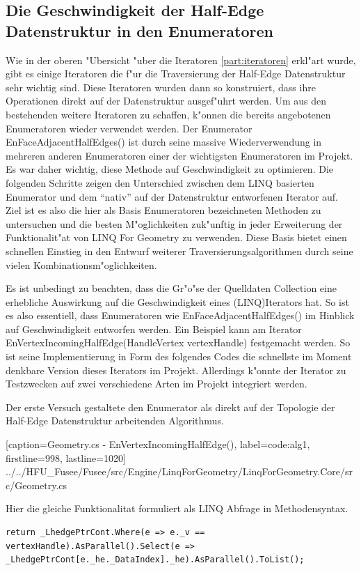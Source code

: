 \documentclass[pagesize, paper=a4, fontsize=12pt,titlepage=true, headings=small, headnosepline, abstractoff, liststotoc, nochapterprefix, plainheadsepline]{scrreprt}
\newcommand{\LFGS}{LINQ For Geometry }
\newcommand{\HES}{Half-Edge Datenstruktur }
\begin{document}
\subsection {Die Geschwindigkeit der Half-Edge Datenstruktur in den Enumeratoren}
Wie in der oberen "Ubersicht "uber die Iteratoren \ref{part:iteratoren} erkl"art wurde, gibt es einige Iteratoren die f"ur die Traversierung der \HES sehr wichtig sind. Diese Iteratoren wurden dann so konstruiert, dass ihre Operationen direkt auf der Datenstruktur ausgef"uhrt werden. Um aus den bestehenden weitere Iteratoren zu schaffen, k"onnen die bereits angebotenen Enumeratoren wieder verwendet werden. Der Enumerator EnFaceAdjacentHalfEdges() ist durch seine massive Wiederverwendung in mehreren anderen Enumeratoren einer der wichtigsten Enumeratoren im Projekt. Es war daher wichtig, diese Methode auf Geschwindigkeit zu optimieren. Die folgenden Schritte zeigen den Unterschied zwischen dem LINQ basierten Enumerator und dem "`nativ"' auf der Datenstruktur entworfenen Iterator auf. Ziel ist es also die hier als Basis Enumeratoren bezeichneten Methoden zu untersuchen und die besten M"oglichkeiten zuk"unftig in jeder Erweiterung der Funktionalit"at von \LFGS zu verwenden. Diese Basis bietet einen schnellen Einstieg in den Entwurf weiterer Traversierungsalgorithmen durch seine vielen Kombinationsm"oglichkeiten.

Es ist unbedingt zu beachten, dass die Gr"o"se der Quelldaten Collection eine erhebliche Auswirkung auf die Geschwindigkeit eines (LINQ)Iterators hat. So ist es also essentiell, dass Enumeratoren wie EnFaceAdjacentHalfEdges() im Hinblick auf Geschwindigkeit entworfen werden. Ein Beispiel kann am Iterator EnVertexIncomingHalfEdge(HandleVertex vertexHandle) festgemacht werden. So ist seine Implementierung in Form des folgendes Codes die schnellste im Moment denkbare Version dieses Iterators im Projekt. Allerdings k"onnte der Iterator zu Testzwecken auf zwei verschiedene Arten im Projekt integriert werden.
\newpage

Der erste Versuch gestaltete den Enumerator als direkt auf der Topologie der \HES arbeitenden Algorithmus.

			[caption={Geometry.cs - EnVertexIncomingHalfEdge()}, label=code:alg1, firstline=998, lastline=1020]
			{../../HFU_Fusee/Fusee/src/Engine/LinqForGeometry/LinqForGeometry.Core/src/Geometry.cs}

Hier die gleiche Funktionalitat formuliert als LINQ Abfrage in Methodensyntax.
\begin{lstlisting}[label={code:alg3}]
return _LhedgePtrCont.Where(e => e._v == vertexHandle).AsParallel().Select(e => _LhedgePtrCont[e._he._DataIndex]._he).AsParallel().ToList();
\end{lstlisting}
\end{document}
